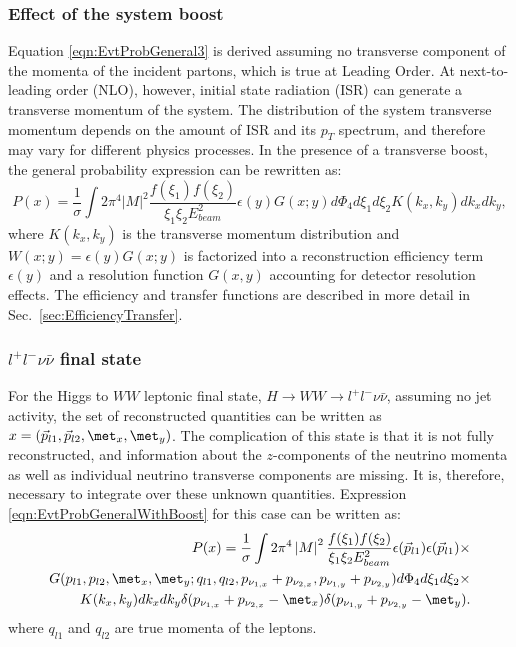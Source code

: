 \subsubsection{Effect of the system boost}
Equation \ref{eqn:EvtProbGeneral3} is derived assuming no transverse component of the momenta of the incident partons,
which is true at Leading Order.   At next-to-leading order (NLO), however, initial state radiation (ISR) can generate a transverse momentum
of the system.  The distribution of the system transverse momentum depends on the amount of ISR and its $p_{T}$ spectrum, and
therefore may vary for different physics processes. In the presence of a transverse boost, the general probability expression can
be rewritten as:
\begin{equation}
P(x)=\frac{1}{\sigma }\int 2 \pi^{4} \left| M \right|^{2} \frac{f(\xi_{1})f(\xi_{2})}{\xi_{1}\xi_{2}E_{beam}^{2}}\epsilon(y)G(x;y)d\Phi_{4}d\xi_{1}d\xi_{2}K(k_{x},k_{y})dk_{x}dk_{y},
\label{eqn:EvtProbGeneralWithBoost}  
\end{equation}
where $K(k_{x},k_{y})$ is the transverse momentum distribution and $W(x;y)=\epsilon(y)G(x;y)$ is factorized into a reconstruction 
efficiency term $\epsilon(y)$ and a resolution function $G(x,y)$ accounting for detector resolution effects.
The efficiency and transfer functions are described in more detail in Sec.~\ref{sec:EfficiencyTransfer}.

\subsubsection{$l^{+}l^{-}\nu\bar{\nu}$ final state }
For the Higgs to $WW$ leptonic final state, $H \rightarrow WW \rightarrow l^{+}l^{-}\nu\bar{\nu}$, assuming no jet activity, 
the set of reconstructed quantities can be written as $x=(\vec{p}_{l1},\vec{p}_{l2}, \met_{x},  \met_{y})$.
The complication of this state is that it is not fully reconstructed, and information about the $z$-components of the neutrino 
momenta as well as individual neutrino transverse components are missing. It is, therefore, necessary to integrate over these 
unknown quantities. Expression \ref{eqn:EvtProbGeneralWithBoost} for this case can be written as:
\begin{eqnarray}
P(x)=\frac{1}{\sigma }\int 2 \pi^{4} \left| M \right|^{2} \frac{f(\xi_{1})f(\xi_{2})}{\xi_{1}\xi_{2}E_{beam}^{2}}
\epsilon(\vec{p}_{l1})\epsilon(\vec{p}_{l1}) \times \nonumber \\ 
                         G(p_{l1},p_{l2}, \met_{x},  \met_{y}; q_{l1}, q_{l2}, p_{\nu_{1,x}}+  p_{\nu_{2,x}}, p_{\nu_{1,y}}+p_{\nu_{2,y}})d\Phi_{4}d\xi_{1}d\xi_{2} \times \nonumber \\
                         K(k_{x},k_{y})dk_{x}dk_{y}\delta(p_{\nu_{1,x}}+p_{\nu_{2,x}}-\met_{x})\delta(p_{\nu_{1,y}}+p_{\nu_{2,y}}-\met_{y}).
\label{eqn:EvtProbGeneralWithBoost2L2nu}  
\end{eqnarray}
where $q_{l1}$ and $q_{l2}$ are true momenta of the leptons.

